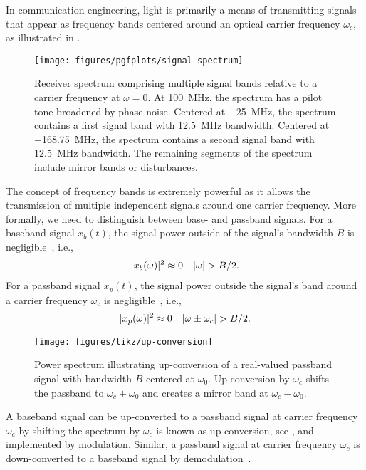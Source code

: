 In communication engineering, light is primarily a means of transmitting signals that appear as frequency bands centered around an optical carrier frequency $\omega_c$, as illustrated in .
\begin{figure}[ht]
	\centering
	\texttt{[image: figures/pgfplots/signal-spectrum]}
	\caption{Receiver spectrum comprising multiple signal bands relative to a carrier frequency at $\omega=0$. At \SI{+100}{\mega\hertz}, the spectrum has a pilot tone broadened by phase noise. Centered at \SI{-25}{\mega\hertz}, the spectrum contains a first signal band with \SI{12.5}{\mega\hertz} bandwidth. Centered at \SI{-168.75}{\mega\hertz}, the spectrum contains a second signal band with \SI{12.5}{\mega\hertz} bandwidth. The remaining segments of the spectrum include mirror bands or disturbances.}\label{fig:signal_spectrum}
\end{figure}
The concept of frequency bands is extremely powerful as it allows the transmission of multiple independent signals around one carrier frequency.
More formally, we need to distinguish between base- and passband signals.
For a baseband signal $x_b(t)$, the signal power outside of the signal's bandwidth $B$ is negligible~\cite[p.~15]{Madhow2008}, i.e.,
\begin{align}
	\lvert x_b(\omega)\rvert^2
	\approx
	0
	&&
	\lvert\omega\rvert
	>
	B/2
	.
\end{align}
For a passband signal $x_p(t)$, the signal power outside the signal's band around a carrier frequency $\omega_c$ is negligible~\cite[p.~16]{Madhow2008}, i.e.,
\begin{align}
	\lvert x_p(\omega)\rvert^2
	\approx
	0
	&&
	\lvert\omega\pm\omega_c\rvert
	>
	B/2
	.	
\end{align}
\begin{figure}[ht]
	\centering
	\texttt{[image: figures/tikz/up-conversion]}
	\caption{Power spectrum illustrating up-conversion of a real-valued passband signal with bandwidth $B$ centered at $\omega_0$. Up-conversion by $\omega_c$ shifts the passband to $\omega_c+\omega_0$ and creates a mirror band at $\omega_c-\omega_0$.}\label{fig:up_conversion}
\end{figure}
A baseband signal can be up-converted to a passband signal at carrier frequency $\omega_c$ by shifting the spectrum by $\omega_c$ is known as up-conversion, see , and implemented by modulation.
Similar, a passband signal at carrier frequency $\omega_c$ is down-converted to a baseband signal by demodulation~\cite[p.~26]{Madhow2008}.

